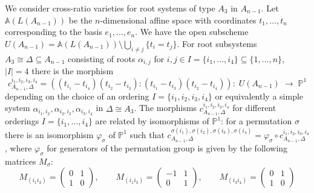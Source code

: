 \documentclass[ALCO,ThmDefs,Unicode,epreuves]{cedram}
\def\phi{\varphi}
\def\A{\mathds A}
\def\P{\mathds P}
\begin{document}
We consider cross-ratio varieties for root systems of type $A_3$ in $A_{n-1}$.
Let $\A(L(A_{n-1}))$ be the $n$-dimensional affine space with coordinates 
$t_1,\ldots,t_n$ corresponding to the basis $e_1,\ldots,e_n$. 
We have the open subscheme
$U(A_{n-1})=\A(L(A_{n-1}))\setminus\bigcup_{i\neq j}\{t_i=t_j\}$.
For root subsystems $A_3\cong\Delta\subseteq A_{n-1}$ consisting of roots
$\alpha_{i,j}$ for $i,j\in I=\{i_1,\ldots,i_4\}\subseteq\{1,\ldots,n\}$, $|I|=4$
there is the morphism
\begin{equation}\label{eq:cAn1Delta}
c_{A_{n-1},\Delta}^{i_1,i_2,i_3,i_4}=
((t_{i_1}-t_{i_4})(t_{i_2}-t_{i_3}):(t_{i_1}-t_{i_3})(t_{i_2}-t_{i_4}))
\colon\;U(A_{n-1})\;\to\;\P^1
\end{equation}
depending on the choice of an ordering $I=\{i_1,i_2,i_3,i_4\}$ or equivalently 
a simple system $\alpha_{i_1,i_2},\alpha_{i_2,i_3},\alpha_{i_3,i_4}$ in 
$\Delta\cong A_3$.
The morphisms $c_{A_{n-1},\Delta}^{i_1,i_2,i_3,i_4}$ for different orderings 
$I=\{i_1,\ldots,i_4\}$ are related by isomorphisms of $\P^1$: for a permutation 
$\sigma$ there is an isomorphism $\phi_\sigma$ of $\P^1$ such that 
$c_{A_{n-1},\Delta}^{\sigma(i_1),\sigma(i_2),\sigma(i_3),\sigma(i_4)}=
\phi_\sigma\circ c_{A_{n-1},\Delta}^{i_1,i_2,i_3,i_4}$, where $\phi_\sigma$ 
for generators of the permutation group is given by the following matrices $M_\sigma$: 
\begin{equation}\label{eq:matrices-permutations}
M_{(i_1i_2)}=\left(\begin{matrix}0&1\\1&0\end{matrix}\right),\qquad
M_{(i_1i_3)}=\left(\begin{matrix}-1&1\\0&1\end{matrix}\right),\qquad
M_{(i_3i_4)}=\left(\begin{matrix}0&1\\1&0\end{matrix}\right)
\end{equation}
\end{document}
